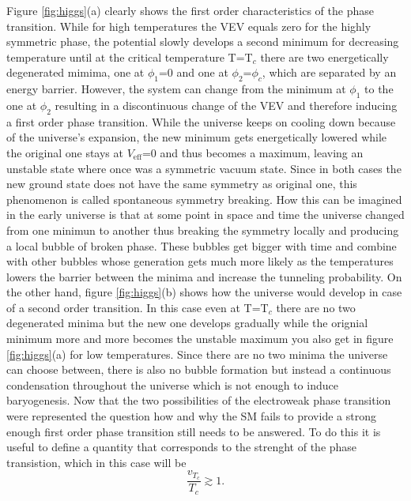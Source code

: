 \noindent
Figure \ref{fig:higgs}(a) clearly shows the first order characteristics of the phase transition. While for high temperatures the VEV equals zero for the highly symmetric phase, the potential slowly develops a second minimum for decreasing temperature until at the critical temperature T=T$_c$ there are two energetically degenerated mimima, one at $\phi_1$=0 and one at $\phi_2$=$\phi_c$, which are separated by an energy barrier. However, the system can change from the minimum at $\phi_1$ to the one at $\phi_2$ resulting in a discontinuous change of the VEV and therefore inducing a first order phase transition. While the universe keeps on cooling down because of the universe's expansion, the new minimum gets energetically lowered while the original one stays at $V_\text{eff}$=0 and thus becomes a maximum, leaving an unstable state where once was a symmetric vacuum state. Since in both cases the new ground state does not have the same symmetry as original one, this phenomenon is called spontaneous symmetry breaking.\newline\indent
How this can be imagined in the early universe is that at some point in space and time the universe changed from one minimun to another thus breaking the symmetry locally and producing a local bubble of broken phase. These bubbles get bigger with time and combine with other bubbles whose generation gets much more likely as the temperatures lowers the barrier between the minima and increase the tunneling probability. \newline\indent
On the other hand, figure \ref{fig:higgs}(b) shows how the universe would develop in case of a second order transition. In this case even at T=T$_c$ there are no two degenerated minima but the new one develops gradually while the orignial minimum more and more becomes the unstable maximum you also get in figure \ref{fig:higgs}(a) for low temperatures. Since there are no two minima the universe can choose between, there is also no bubble formation but instead a continuous condensation throughout the universe which is not enough to induce baryogenesis. \newline\indent
Now that the two possibilities of the electroweak phase transition were represented the question how and why the SM fails to provide a strong enough first order phase transition still needs to be answered. \newline\indent
To do this it is useful to define a quantity that corresponds to the strenght of the phase transistion, which in this case will be 
\begin{equation}
	\frac{v_{T_c}}{T_c}\gtrsim1.
	\label{eq:strength_transition}
\end{equation}

